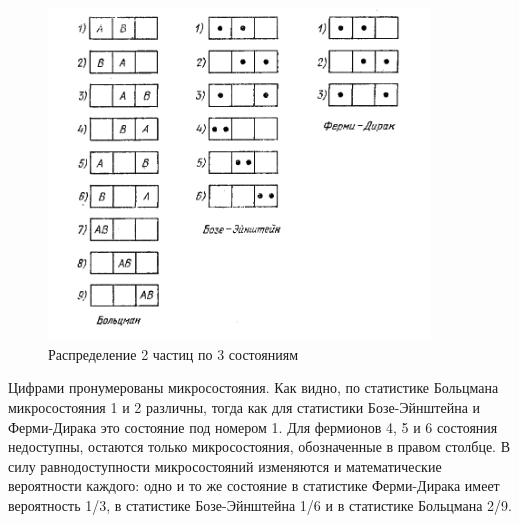 \documentclass[a4paper,12pt]{article}
\begin{document}
\begin{figure}[h!]
\centering
\includegraphics[width=0.9\textwidth]{cells.png}
\caption{Распределение 2 частиц по 3 состояниям }
\end{figure}
\newpage

Цифрами пронумерованы микросостояния. Как видно, по статистике Больцмана микросостояния 1 и 2 различны, тогда как для статистики Бозе-Эйнштейна и Ферми-Дирака это состояние под номером 1. Для фермионов 4, 5 и 6 состояния недоступны, остаются только микросостояния, обозначенные в правом столбце. В силу равнодоступности микросостояний изменяются и математические вероятности каждого: одно и то же состояние в статистике Ферми-Дирака имеет вероятность 1/3, в статистике Бозе-Эйнштейна 1/6 и в статистике Больцмана 2/9.
\end{document}
